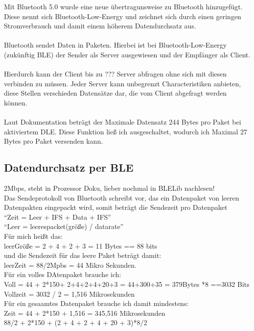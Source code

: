 Mit Bluetooth 5.0 wurde eine neue übertragunsweise zu 
Bluetooth hinzugefügt. Diese nennt sich Bluetooth-Low-Energy und zeichnet
sich durch einen geringen Stromverbrauch und damit einem höherem 
Datendurchsatz aus. \\
\\
Bluetooth sendet Daten in Paketen. Hierbei ist bei Bluetooth-Low-Energy
(zukünftig BLE) der Sender als Server ausgewiesen und der Empfänger als Client.\\
\\
Hierdurch kann der Client bis zu ??? Server abfragen ohne sich mit diesen 
verbinden zu müssen. Jeder Server kann unbegrenzt Characteristiken anbieten,
diese Stellen verschieden Datensätze dar, die vom Client abgefragt werden können.\\
\\
Laut Dokumentation beträgt der Maximale Datensatz 244 Bytes pro Paket bei 
aktiviertem DLE. Diese Funktion ließ ich ausgeschaltet, wodurch ich Maximal
27 Bytes pro Paket versenden kann. \\

\subsection{Datendurchsatz per BLE}
2Mbps, steht in Prozessor Doku, lieber nochmal in BLELib nachlesen!
\\
Das Sendeprotokoll von Bluetooth schreibt vor, das ein Datenpaket von
leeren Datenpakten eingepackt wird, somit beträgt die Sendezeit pro 
Datenpaket 
\\
``Zeit = Leer + IFS + Data + IFS''
\\
``Leer = leerespacket(größe) / datarate''
\\
Für mich heißt das:\\
leerGröße = 2 + 4 + 2 + 3 = 11 Bytes == 88 bits
\\
und die Sendezeit für das leere Paket beträgt damit:
\\
leerZeit = 88/2Mpbs = 44 Mikro Sekunden.
\\
Für ein volles DAtenpaket brauche ich:\\
Voll = 44 + 2*150+ 2+4+2+4+20+3 = 44+300+35 = 379Bytes *8 ==3032 Bits\\
Vollzeit = 3032 / 2 = 1,516 Mikrosekunden
\\
Für ein gesaamtes Datenpaket brauche ich damit mindestens:\\
Zeit = 44 + 2*150 + 1,516 = 345,516 Mikrosekunden
\\
88/2 + 2*150 + (2 + 4 + 2 + 4 + 20 + 3)*8/2

